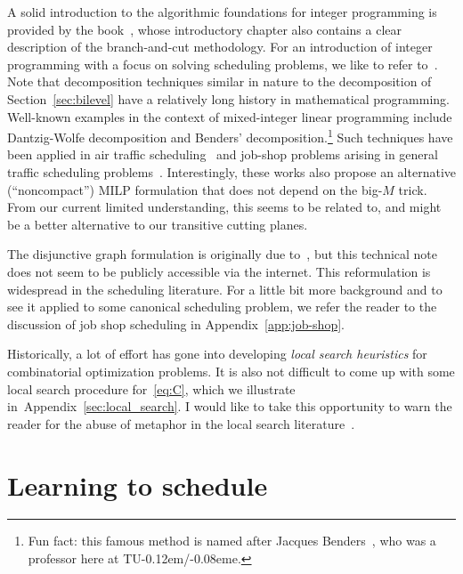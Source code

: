 \documentclass{report}
\theoremstyle{definition}
\theoremstyle{plain}
\newcommand{\TUE}{TU\kern-0.12em/\kern-0.08eme}
\begin{document}
A solid introduction to the algorithmic foundations for integer programming is
provided by the book~\cite{confortiIntegerProgramming2014}, whose introductory chapter also contains a clear
description of the branch-and-cut methodology. For an introduction of integer
programming with a focus on solving scheduling problems, we like to refer
to~\cite[Appendix A]{pinedoSchedulingTheoryAlgorithms2016}.
%
Note that decomposition techniques similar in nature to the decomposition of
Section~\ref{sec:bilevel} have a relatively long history in mathematical programming.
Well-known examples in the context of mixed-integer linear programming include
Dantzig-Wolfe decomposition and Benders' decomposition.\footnote{Fun fact: this
  famous method is named after Jacques
  Benders~\cite{aardalJacquesBendersHis2025}, who was a professor here at \TUE.}
%
Such techniques have been applied in air traffic scheduling~\cite{manninoPathCycleFormulation2018} and job-shop
problems arising in general traffic scheduling problems~\cite{lamorgeseNoncompactFormulationJobShop2019}.
%
Interestingly, these works also propose an alternative (``noncompact'') MILP
formulation that does not depend on the big-$M$ trick. From our current limited
understanding, this seems to be related to, and might be a better alternative to
our transitive cutting planes.

The disjunctive graph formulation is originally due
to~\cite{roy1964disjunctive}, but this technical note does not seem to be
publicly accessible via the internet.
%
This reformulation is widespread in the scheduling literature. For a little bit
more background and to see it applied to some canonical scheduling problem, we
refer the reader to the discussion of job shop scheduling in
Appendix~\ref{app:job-shop}.
%

Historically, a lot of effort has gone into developing \emph{local search
  heuristics} for combinatorial optimization problems.
%
It is also not difficult to come up with some local search procedure
for~\eqref{eq:C}, which we illustrate in~Appendix~\ref{sec:local_search}.
%
I would like to take this opportunity to warn the reader for the abuse of
metaphor in the local search
literature~\cite{sorensenMetaheuristicsMetaphorExposed2015}.


\chapter{Learning to schedule}\label{chap:single-learning}
\end{document}
